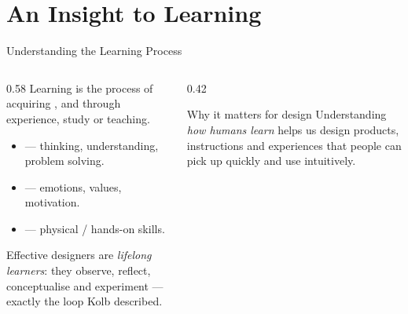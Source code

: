 
\section{An Insight to Learning}

\begin{frame}{Understanding the Learning Process}
  \accentrule\\[0.3em]
  \begin{columns}[T]
    \begin{column}{0.58\textwidth}\small
      Learning is the process of acquiring ,  and
       through experience, study or teaching.
      \begin{itemize}\small
        \item {} — thinking, understanding, problem solving.
        \item {} — emotions, values, motivation.
        \item {} — physical / hands-on skills.
      \end{itemize}
      \vspace{0.3em}
      Effective designers are \emph{lifelong learners}: they observe, reflect,
      conceptualise and experiment — exactly the loop Kolb described.
    \end{column}
    \begin{column}{0.42\textwidth}
      \begin{block}{Why it matters for design}
        \scriptsize
        Understanding \emph{how humans learn} helps us design products,
        instructions and experiences that people can pick up quickly and use
        intuitively.
      \end{block}
    \end{column}
  \end{columns}
\end{frame}

